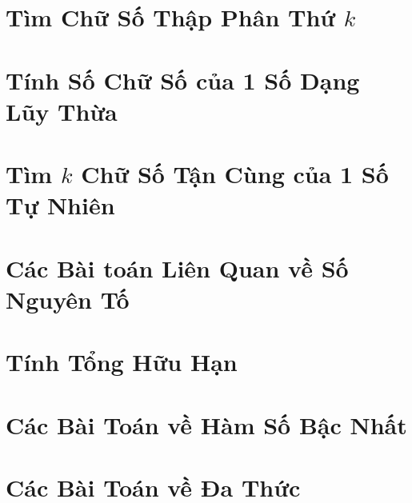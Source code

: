 \documentclass{article}
\begin{document}

\section{Tìm Chữ Số Thập Phân Thứ $k$}


\section{Tính Số Chữ Số của 1 Số Dạng Lũy Thừa}


\section{Tìm $k$ Chữ Số Tận Cùng của 1 Số Tự Nhiên}


\section{Các Bài toán Liên Quan về Số Nguyên Tố}


\section{Tính Tổng Hữu Hạn}


\section{Các Bài Toán về Hàm Số Bậc Nhất}


\section{Các Bài Toán về Đa Thức}

\end{document}
